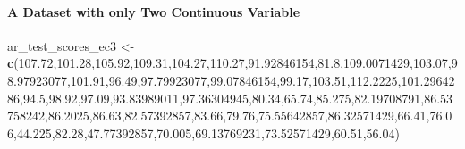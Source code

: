 \documentclass[
]{book}
\newenvironment{Shaded}{\begin{snugshade}}{\end{snugshade}}
\newcommand{\FloatTok}[1]{\textcolor[rgb]{0.00,0.00,0.81}{#1}}
\newcommand{\KeywordTok}[1]{\textcolor[rgb]{0.13,0.29,0.53}{\textbf{#1}}}
\newcommand{\NormalTok}[1]{#1}
\newcommand{\StringTok}[1]{\textcolor[rgb]{0.31,0.60,0.02}{#1}}
\begin{document}
\hypertarget{a-dataset-with-only-two-continuous-variable}{%
\paragraph{A Dataset with only Two Continuous Variable}\label{a-dataset-with-only-two-continuous-variable}}

\begin{Shaded}
\begin{Highlighting}[]
\NormalTok{ar\_test\_scores\_ec3 \textless{}{-}}\StringTok{ }\KeywordTok{c}\NormalTok{(}\FloatTok{107.72}\NormalTok{,}\FloatTok{101.28}\NormalTok{,}\FloatTok{105.92}\NormalTok{,}\FloatTok{109.31}\NormalTok{,}\FloatTok{104.27}\NormalTok{,}\FloatTok{110.27}\NormalTok{,}\FloatTok{91.92846154}\NormalTok{,}\FloatTok{81.8}\NormalTok{,}\FloatTok{109.0071429}\NormalTok{,}\FloatTok{103.07}\NormalTok{,}\FloatTok{98.97923077}\NormalTok{,}\FloatTok{101.91}\NormalTok{,}\FloatTok{96.49}\NormalTok{,}\FloatTok{97.79923077}\NormalTok{,}\FloatTok{99.07846154}\NormalTok{,}\FloatTok{99.17}\NormalTok{,}\FloatTok{103.51}\NormalTok{,}\FloatTok{112.2225}\NormalTok{,}\FloatTok{101.2964286}\NormalTok{,}\FloatTok{94.5}\NormalTok{,}\FloatTok{98.92}\NormalTok{,}\FloatTok{97.09}\NormalTok{,}\FloatTok{93.83989011}\NormalTok{,}\FloatTok{97.36304945}\NormalTok{,}\FloatTok{80.34}\NormalTok{,}\FloatTok{65.74}\NormalTok{,}\FloatTok{85.275}\NormalTok{,}\FloatTok{82.19708791}\NormalTok{,}\FloatTok{86.53758242}\NormalTok{,}\FloatTok{86.2025}\NormalTok{,}\FloatTok{86.63}\NormalTok{,}\FloatTok{82.57392857}\NormalTok{,}\FloatTok{83.66}\NormalTok{,}\FloatTok{79.76}\NormalTok{,}\FloatTok{75.55642857}\NormalTok{,}\FloatTok{86.32571429}\NormalTok{,}\FloatTok{66.41}\NormalTok{,}\FloatTok{76.06}\NormalTok{,}\FloatTok{44.225}\NormalTok{,}\FloatTok{82.28}\NormalTok{,}\FloatTok{47.77392857}\NormalTok{,}\FloatTok{70.005}\NormalTok{,}\FloatTok{69.13769231}\NormalTok{,}\FloatTok{73.52571429}\NormalTok{,}\FloatTok{60.51}\NormalTok{,}\FloatTok{56.04}\NormalTok{)}

\end{Highlighting}
\end{Shaded}
\end{document}
